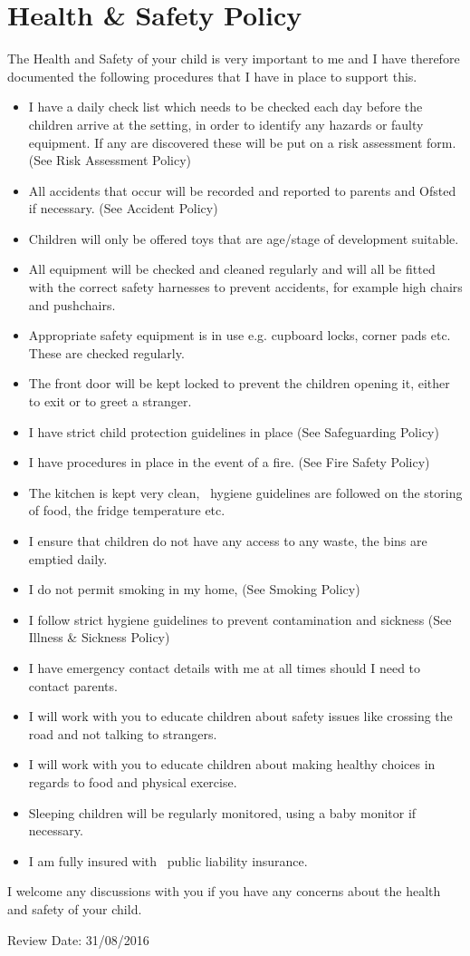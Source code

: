 
\section{Health \& Safety Policy}

The Health and Safety of your child is very important to me and I have
therefore documented the following procedures that I have in place to
support this.

\begin{itemize}
\item
  I have a daily check list which needs to be checked each day before
  the children arrive at the setting, in order to identify any hazards
  or faulty equipment. If any are discovered these will be put on a risk
  assessment form. (See Risk Assessment Policy)
\item
  All accidents that occur will be recorded and reported to parents and
  Ofsted if necessary. (See Accident Policy)
\item
  Children will only be offered toys that are age/stage of development
  suitable.
\item
  All equipment will be checked and cleaned regularly and will all be
  fitted with the correct safety harnesses to prevent accidents, for
  example high chairs and pushchairs.
\item
  Appropriate safety equipment is in use e.g. cupboard locks, corner
  pads etc. These are checked regularly.
\item
  The front door will be kept locked to prevent the children opening
  it, either to exit or to greet a stranger.
\item
  I have strict child protection guidelines in place (See Safeguarding
  Policy)
\item
  I have procedures in place in the event of a fire. (See Fire Safety
  Policy)
\item
  The kitchen is kept very clean, ~hygiene guidelines are followed on
  the storing of food, the fridge temperature etc.
\item
  I ensure that children do not have any access to any waste, the bins
  are emptied daily.
\item
  I do not permit smoking in my home, (See Smoking Policy)
\item
  I follow strict hygiene guidelines to prevent contamination and
  sickness (See Illness \& Sickness Policy)
\item
  I have emergency contact details with me at all times should I need
  to contact parents.
\item
  I will work with you to educate children about safety issues like
  crossing the road and not talking to strangers.
\item
  I will work with you to educate children about making healthy choices
  in regards to food and physical exercise.
\item
  Sleeping children will be regularly monitored, using a baby monitor
  if necessary.
\item
  I am fully insured with ~public liability insurance.
\end{itemize}

I welcome any discussions with you if you have any concerns about the
health and safety of your child.

Review Date: 31/08/2016


